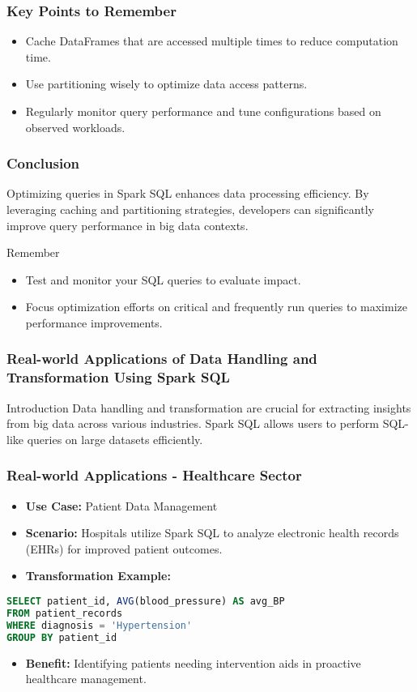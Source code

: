 \documentclass[aspectratio=169]{beamer}
\begin{document}
\begin{frame}
  \frametitle{Key Points to Remember}
  \begin{itemize}
    \item Cache DataFrames that are accessed multiple times to reduce computation time.
    \item Use partitioning wisely to optimize data access patterns.
    \item Regularly monitor query performance and tune configurations based on observed workloads.
  \end{itemize}
\end{frame}

\begin{frame}
  \frametitle{Conclusion}
  Optimizing queries in Spark SQL enhances data processing efficiency. By leveraging caching and partitioning strategies, developers can significantly improve query performance in big data contexts.
  
  \begin{block}{Remember}
    \begin{itemize}
      \item Test and monitor your SQL queries to evaluate impact.
      \item Focus optimization efforts on critical and frequently run queries to maximize performance improvements.
    \end{itemize}
  \end{block}
\end{frame}

\begin{frame}
  \frametitle{Real-world Applications of Data Handling and Transformation Using Spark SQL}
  \begin{block}{Introduction}
    Data handling and transformation are crucial for extracting insights from big data across various industries. 
    Spark SQL allows users to perform SQL-like queries on large datasets efficiently.
  \end{block}
\end{frame}

\begin{frame}[fragile]
  \frametitle{Real-world Applications - Healthcare Sector}
  \begin{itemize}
    \item \textbf{Use Case:} Patient Data Management
    \item \textbf{Scenario:} Hospitals utilize Spark SQL to analyze electronic health records (EHRs) for improved patient outcomes.
    \item \textbf{Transformation Example:}
  \end{itemize}
  \begin{lstlisting}[language=SQL]
SELECT patient_id, AVG(blood_pressure) AS avg_BP
FROM patient_records
WHERE diagnosis = 'Hypertension'
GROUP BY patient_id
  \end{lstlisting}
  \begin{itemize}
    \item \textbf{Benefit:} Identifying patients needing intervention aids in proactive healthcare management.
  \end{itemize}
\end{frame}
\end{document}
